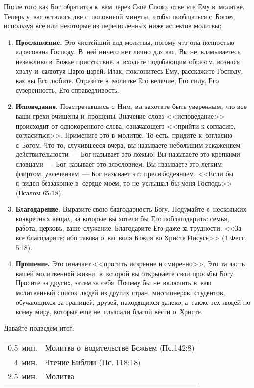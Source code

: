 \documentclass[11pt,article,a4paper,fittopage,oneside]{article}
\begin{document}
\begin{multicols}{2}
После того как Бог обратится к~вам через Свое Слово, ответьте Ему в~молитве. Теперь у~вас осталось две с~половиной минуты, чтобы пообщаться с~Богом, используя все или некоторые из перечисленных ниже аспектов молитвы:
\begin{enumerate}
\item \textbf{Прославление.}  Это чистейший вид молитвы, потому что она полностью адресована Господу. В~ней ничего нет лично для вас. Вы не~вламываетесь невежливо в~Божье присутствие, а~входите подобающим образом, вознося хвалу и~салютуя Царю царей. Итак, поклонитесь Ему, расскажите Господу, как вы Его любите. Отразите в~молитве Его величие, Его силу, Его суверенность, Его справедливость.
\item \textbf{Исповедание.} Повстречавшись с~Ним, вы захотите быть уверенным, что все ваши грехи очищены и~прощены. Значение слова <<исповедание>> происходит от однокоренного слова, означающего <<прийти к согласию, согласиться>>. Примените это в~молитве. То есть, придите к~согласию с~Богом. Что-то, случившееся вчера, вы называете небольшим искажением действительности~--- Бог называет это ложью! Вы называете это крепкими словцами~--- Бог называет это злословием. Вы называете это легким флиртом, увлечением~--- Бог называет это прелюбодеянием. <<Если бы я~видел беззаконие в~сердце моем, то не~услышал бы меня Господь>> (Псалом 65:18).
\item \textbf{Благодарение.} Выразите свою благодарность Богу. Подумайте о~нескольких конкретных вещах, за которые вы хотели бы Его поблагодарить: семья, работа, церковь, ваше служение. Благодарите Его даже за трудности. <<За все благодарите: ибо такова о~вас воля Божия во Христе Иисусе>> (1 Фесс. 5:18).
\item \textbf{Прошение.} Это означает <<просить искренне и смиренно>>. Это та часть вашей молитвенной жизни, в~которой вы открываете свои просьбы Богу. Просите за других, затем за себя. Почему бы не~включить в~ваш молитвенный список людей из других стран, миссионеров, студентов, обучающихся за границей, друзей, находящихся далеко, а~также тех людей по всему миру, которые еще не~слышали благой вести о~Христе.
\end{enumerate}

Давайте подведем итог:
\vspace{0.3cm}

\begin{tabular}{ r p{5.4cm} }
  0.5\ мин. & Молитва о~водительстве Божьем (Пс.142:8)\\
    4\ мин. & Чтение Библии (Пс. 118:18) \\
  2.5\ мин. & Молитва 
\end{tabular}


\end{multicols}
\end{document}
